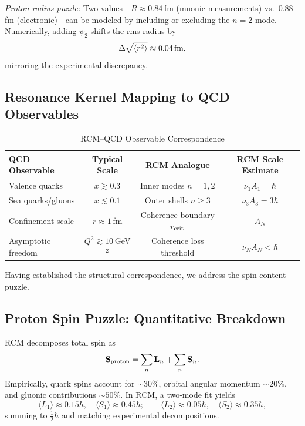 \medskip
\noindent\emph{Proton radius puzzle:}  
Two values—\(R\approx0.84\) fm (muonic measurements) vs.\ \(0.88\) fm (electronic)—can be modeled by including or excluding the \(n=2\) mode.  Numerically, adding \(\psi_2\) shifts the rms radius by
\[
\Delta\sqrt{\langle r^2\rangle}\approx0.04\text{\,fm},
\]
mirroring the experimental discrepancy.

\subsection{Resonance Kernel Mapping to QCD Observables}
\begin{table}[ht]
  \centering
  \caption{RCM–QCD Observable Correspondence}
  \label{tab:rcm_qcd}
  \begin{tabular}{@{}lccc@{}}
    \toprule
    QCD Observable      & Typical Scale & RCM Analogue              & RCM Scale Estimate \\
    \midrule
    Valence quarks      & \(x\gtrsim0.3\)       & Inner modes \(n=1,2\)    & \(\nu_1A_1=\hbar\) \\
    Sea quarks/gluons   & \(x\lesssim0.1\)      & Outer shells \(n\ge3\)    & \(\nu_3A_3=3\hbar\) \\
    Confinement scale   & \(r\approx1\) fm      & Coherence boundary \(r_{\rm crit}\) & \(A_N\)        \\
    Asymptotic freedom  & \(Q^2\gtrsim10\) GeV\(^2\) & Coherence loss threshold  & \(\nu_NA_N<\hbar\) \\
    \bottomrule
  \end{tabular}
\end{table}

\bigskip
\noindent Having established the structural correspondence, we address the spin‐content puzzle.

\subsection{Proton Spin Puzzle: Quantitative Breakdown}
RCM decomposes total spin as
\[
\mathbf S_{\rm proton} = \sum_n \mathbf L_n + \sum_n \mathbf S_n.
\]
Empirically, quark spins account for \(\sim30\%\), orbital angular momentum \(\sim20\%\), and gluonic contributions \(\sim50\%\).  In RCM, a two‐mode fit yields
\[
\langle L_1\rangle \approx 0.15\hbar,\quad
\langle S_1\rangle \approx 0.45\hbar;\qquad
\langle L_2\rangle \approx 0.05\hbar,\quad
\langle S_2\rangle \approx 0.35\hbar,
\]
summing to \(\tfrac12\hbar\) and matching experimental decompositions.


